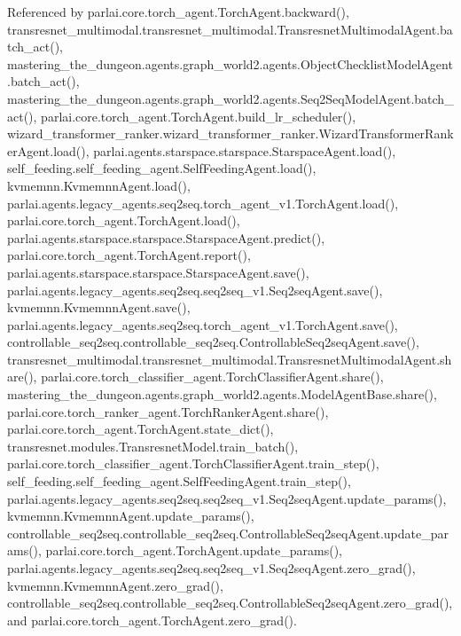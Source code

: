 Referenced by parlai.\+core.\+torch\+\_\+agent.\+Torch\+Agent.\+backward(), transresnet\+\_\+multimodal.\+transresnet\+\_\+multimodal.\+Transresnet\+Multimodal\+Agent.\+batch\+\_\+act(), mastering\+\_\+the\+\_\+dungeon.\+agents.\+graph\+\_\+world2.\+agents.\+Object\+Checklist\+Model\+Agent.\+batch\+\_\+act(), mastering\+\_\+the\+\_\+dungeon.\+agents.\+graph\+\_\+world2.\+agents.\+Seq2\+Seq\+Model\+Agent.\+batch\+\_\+act(), parlai.\+core.\+torch\+\_\+agent.\+Torch\+Agent.\+build\+\_\+lr\+\_\+scheduler(), wizard\+\_\+transformer\+\_\+ranker.\+wizard\+\_\+transformer\+\_\+ranker.\+Wizard\+Transformer\+Ranker\+Agent.\+load(), parlai.\+agents.\+starspace.\+starspace.\+Starspace\+Agent.\+load(), self\+\_\+feeding.\+self\+\_\+feeding\+\_\+agent.\+Self\+Feeding\+Agent.\+load(), kvmemnn.\+Kvmemnn\+Agent.\+load(), parlai.\+agents.\+legacy\+\_\+agents.\+seq2seq.\+torch\+\_\+agent\+\_\+v1.\+Torch\+Agent.\+load(), parlai.\+core.\+torch\+\_\+agent.\+Torch\+Agent.\+load(), parlai.\+agents.\+starspace.\+starspace.\+Starspace\+Agent.\+predict(), parlai.\+core.\+torch\+\_\+agent.\+Torch\+Agent.\+report(), parlai.\+agents.\+starspace.\+starspace.\+Starspace\+Agent.\+save(), parlai.\+agents.\+legacy\+\_\+agents.\+seq2seq.\+seq2seq\+\_\+v1.\+Seq2seq\+Agent.\+save(), kvmemnn.\+Kvmemnn\+Agent.\+save(), parlai.\+agents.\+legacy\+\_\+agents.\+seq2seq.\+torch\+\_\+agent\+\_\+v1.\+Torch\+Agent.\+save(), controllable\+\_\+seq2seq.\+controllable\+\_\+seq2seq.\+Controllable\+Seq2seq\+Agent.\+save(), transresnet\+\_\+multimodal.\+transresnet\+\_\+multimodal.\+Transresnet\+Multimodal\+Agent.\+share(), parlai.\+core.\+torch\+\_\+classifier\+\_\+agent.\+Torch\+Classifier\+Agent.\+share(), mastering\+\_\+the\+\_\+dungeon.\+agents.\+graph\+\_\+world2.\+agents.\+Model\+Agent\+Base.\+share(), parlai.\+core.\+torch\+\_\+ranker\+\_\+agent.\+Torch\+Ranker\+Agent.\+share(), parlai.\+core.\+torch\+\_\+agent.\+Torch\+Agent.\+state\+\_\+dict(), transresnet.\+modules.\+Transresnet\+Model.\+train\+\_\+batch(), parlai.\+core.\+torch\+\_\+classifier\+\_\+agent.\+Torch\+Classifier\+Agent.\+train\+\_\+step(), self\+\_\+feeding.\+self\+\_\+feeding\+\_\+agent.\+Self\+Feeding\+Agent.\+train\+\_\+step(), parlai.\+agents.\+legacy\+\_\+agents.\+seq2seq.\+seq2seq\+\_\+v1.\+Seq2seq\+Agent.\+update\+\_\+params(), kvmemnn.\+Kvmemnn\+Agent.\+update\+\_\+params(), controllable\+\_\+seq2seq.\+controllable\+\_\+seq2seq.\+Controllable\+Seq2seq\+Agent.\+update\+\_\+params(), parlai.\+core.\+torch\+\_\+agent.\+Torch\+Agent.\+update\+\_\+params(), parlai.\+agents.\+legacy\+\_\+agents.\+seq2seq.\+seq2seq\+\_\+v1.\+Seq2seq\+Agent.\+zero\+\_\+grad(), kvmemnn.\+Kvmemnn\+Agent.\+zero\+\_\+grad(), controllable\+\_\+seq2seq.\+controllable\+\_\+seq2seq.\+Controllable\+Seq2seq\+Agent.\+zero\+\_\+grad(), and parlai.\+core.\+torch\+\_\+agent.\+Torch\+Agent.\+zero\+\_\+grad().

